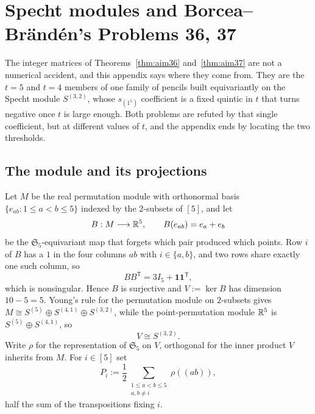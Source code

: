 \section{Specht modules and Borcea--Br\"and\'en's Problems 36, 37}
\label{sec:aim36pencil}

The integer matrices of Theorems~\ref{thm:aim36} and~\ref{thm:aim37} are not a numerical accident,
and this appendix says where they come from.  They are the $t=5$ and $t=4$
members of one family of pencils built equivariantly on the Specht module
$S^{(3,2)}$, whose $s_{(1^5)}$ coefficient is a fixed quintic in $t$ that turns
negative once $t$ is large enough.  Both problems are refuted by that single
coefficient, but at different values of $t$, and the appendix ends by locating
the two thresholds.

\subsection*{The module and its projections}

Let $M$ be the real permutation module with orthonormal basis
$\{e_{ab}:1\le a<b\le5\}$ indexed by the $2$-subsets of $[5]$, and let
\[
B:M\longrightarrow\mathbb R^5,\qquad B(e_{ab})=e_a+e_b
\]
be the $\mathfrak S_5$-equivariant map that forgets which pair produced which
points.  Row $i$ of $B$ has a $1$ in the four columns $ab$ with $i\in\{a,b\}$,
and two rows share exactly one such column, so
\[
BB^{\mathsf T}=3I_5+\mathbf 1\mathbf 1^{\mathsf T},
\]
which is nonsingular.  Hence $B$ is surjective and $V:=\ker B$ has dimension
$10-5=5$.  Young's rule for the permutation module on $2$-subsets gives
$M\cong S^{(5)}\oplus S^{(4,1)}\oplus S^{(3,2)}$, while the point-permutation
module $\mathbb R^5$ is $S^{(5)}\oplus S^{(4,1)}$, so
\[
V\cong S^{(3,2)}.
\]
Write $\rho$ for the representation of $\mathfrak S_5$ on $V$, orthogonal for
the inner product $V$ inherits from $M$.  For $i\in[5]$ set
\begin{equation}\label{eq:aim36-Pi}
P_i:=\frac12\sum_{\substack{1\le a<b\le5\\a,b\ne i}}\rho((ab)),
\end{equation}
half the sum of the transpositions fixing $i$.

